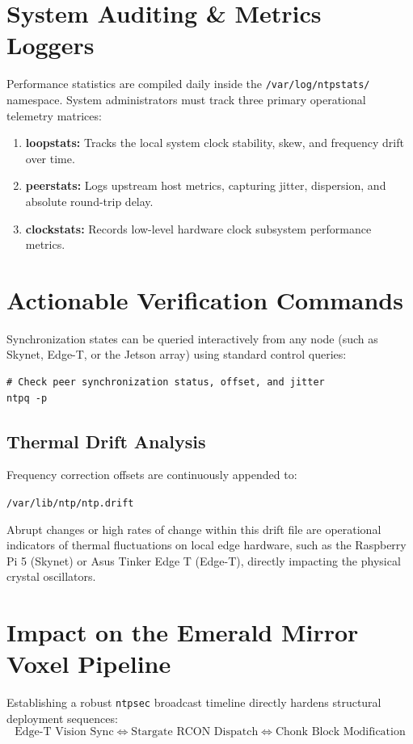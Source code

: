 \section{System Auditing \& Metrics Loggers}
Performance statistics are compiled daily inside the \texttt{/var/log/ntpstats/} namespace. System administrators must track three primary operational telemetry matrices:
\begin{enumerate}
    \item \textbf{loopstats:} Tracks the local system clock stability, skew, and frequency drift over time.
    \item \textbf{peerstats:} Logs upstream host metrics, capturing jitter, dispersion, and absolute round-trip delay.
    \item \textbf{clockstats:} Records low-level hardware clock subsystem performance metrics.
\end{enumerate}

\section{Actionable Verification Commands}
Synchronization states can be queried interactively from any node (such as Skynet, Edge-T, or the Jetson array) using standard control queries:

\begin{lstlisting}[style=bashstyle, caption={NTP Query Utility Verification}]
# Check peer synchronization status, offset, and jitter
ntpq -p
\end{lstlisting}

\subsection{Thermal Drift Analysis}
Frequency correction offsets are continuously appended to:
\begin{center}
    \texttt{/var/lib/ntp/ntp.drift}
\end{center}

Abrupt changes or high rates of change within this drift file are operational indicators of thermal fluctuations on local edge hardware, such as the Raspberry Pi 5 (Skynet) or Asus Tinker Edge T (Edge-T), directly impacting the physical crystal oscillators.

\section{Impact on the Emerald Mirror Voxel Pipeline}
Establishing a robust \texttt{ntpsec} broadcast timeline directly hardens structural deployment sequences:
\begin{equation}
    \text{Edge-T Vision Sync} \Longleftrightarrow \text{Stargate RCON Dispatch} \Longleftrightarrow \text{Chonk Block Modification}
\end{equation}

